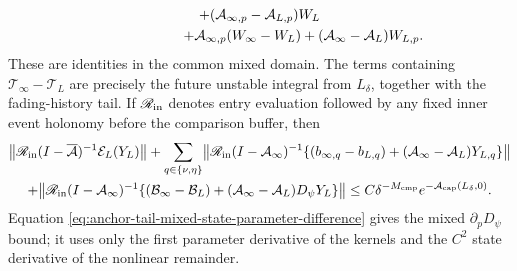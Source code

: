 \begin{lemma}
\begin{multline}
   +(\mathcal A_{\infty,p}-\mathcal A_{L,p})W_L\\
 \hspace{2.2cm}
   +\mathcal A_{\infty,p}(W_\infty-W_L)
   +(\mathcal A_\infty-\mathcal A_L)W_{L,p}.
                                                        \label{eq:anchor-tail-mixed-state-parameter-difference}
\end{multline}
These are identities in the common mixed domain.  The terms containing
\(\mathcal T_\infty-\mathcal T_L\) are precisely the future unstable
integral from \(L_\delta\), together with the fading-history tail.  If
\(\mathscr R_{\rm in}\) denotes entry evaluation followed by any fixed
inner event holonomy before the comparison buffer, then
\begin{multline}
 \bigl\|\mathscr R_{\rm in}
   (I-\overline{\mathcal A})^{-1}\mathcal E_L(Y_L)\bigr\|
 +\sum_{q\in\{\nu,\eta\}}
  \bigl\|\mathscr R_{\rm in}
    (I-\mathcal A_\infty)^{-1}
       \{(b_{\infty,q}-b_{L,q})
          +(\mathcal A_\infty-\mathcal A_L)Y_{L,q}\}\bigr\|\\
 +\bigl\|\mathscr R_{\rm in}
    (I-\mathcal A_\infty)^{-1}
       \{(\mathcal B_\infty-\mathcal B_L)
          +(\mathcal A_\infty-\mathcal A_L)D_\psi Y_L\}\bigr\|
 \le C\delta^{-M_{\rm cmp}}
       e^{-\mathcal A_{\rm cap}(L_\delta,0)}.         \label{eq:anchor-tail-Green-difference-bound}
\end{multline}
Equation
\cref{eq:anchor-tail-mixed-state-parameter-difference} gives the mixed
\(\partial_pD_\psi\) bound; it uses only the first parameter derivative of
the kernels and the \(C^2\) state derivative of the nonlinear remainder.


\end{lemma}
